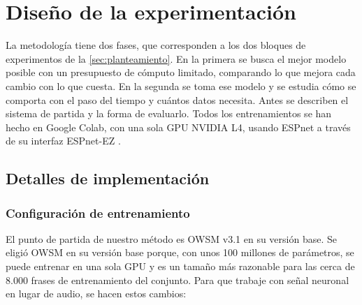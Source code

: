 
\providecommand{\figpendiente}[1]{\fbox{\parbox{0.92\textwidth}{\centering\vspace{1.3cm}\textit{[Figura pendiente: #1]}\vspace{1.3cm}}}}

\chapter{Diseño de la experimentación}
\label{cap:experimentacion}

La metodología tiene dos fases, que corresponden a los dos bloques de experimentos de la \cref{sec:planteamiento}. En la primera se busca el mejor modelo posible con un presupuesto de cómputo limitado, comparando lo que mejora cada cambio con lo que cuesta. En la segunda se toma ese modelo y se estudia cómo se comporta con el paso del tiempo y cuántos datos necesita. Antes se describen el sistema de partida y la forma de evaluarlo. Todos los entrenamientos se han hecho en Google Colab, con una sola GPU NVIDIA L4, usando ESPnet a través de su interfaz ESPnet-EZ \cite{watanabe2018espnet,someki2024espnetez}.

\section{Detalles de implementación}

\subsection{Configuración de entrenamiento}
\label{sec:adaptacion-modalidad}

El punto de partida de nuestro método es OWSM v3.1 en su versión base. Se eligió OWSM en su versión base porque, con unos 100 millones de parámetros, se puede entrenar en una sola GPU y es un tamaño más razonable para las cerca de 8.000 frases de entrenamiento del conjunto. Para que trabaje con señal neuronal en lugar de audio, se hacen estos cambios:

